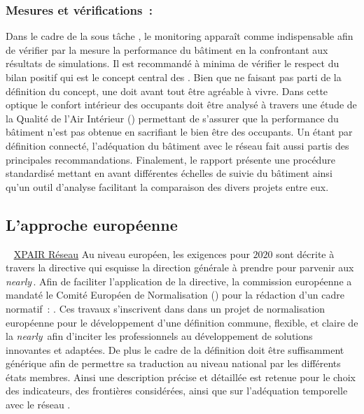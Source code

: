 \subsubsection{Mesures et vérifications~:} %
\label{ssub:mesures_et_verifications}
Dans le cadre de la sous tâche  \parencite{Noris2013}, le monitoring apparaît comme indispensable
afin de vérifier par la mesure la performance du bâtiment en la confrontant aux
résultats de simulations. Il est recommandé à minima de vérifier le respect du bilan
positif qui est le concept central des . Bien que ne faisant pas parti de
la définition du concept, une  doit avant tout être agréable à vivre. Dans cette
optique le confort intérieur des occupants doit être analysé à travers une étude de
la Qualité de l’Air Intérieur () permettant de s’assurer que la performance du bâtiment n’est pas
obtenue en sacrifiant le bien être des occupants. Un  étant par définition connecté,
l’adéquation du bâtiment avec le réseau fait aussi partis des principales recommandations.
Finalement, le rapport présente une procédure standardisé mettant en avant différentes échelles
de suivie du bâtiment ainsi qu’un outil d’analyse facilitant la comparaison des divers projets entre eux.


\subsection{L’approche européenne} %
\label{ssub:l_approche_europeenne}
~
\href{http://tinyurl.com/y7uqfe8r}{XPAIR Réseau}
Au niveau européen, les exigences pour $2020$ sont décrite à travers la directive
 \parencite{EPBD2010} qui esquisse la direction générale à prendre pour
parvenir aux \textit{nearly}\,. Afin de faciliter l’application de la directive, la commission
européenne a mandaté le Comité Européen de Normalisation ()
pour la rédaction d’un cadre normatif~:  . Ces travaux s’inscrivent
dans dans un projet de normalisation européenne pour le développement d’une définition
commune, flexible, et claire de la \textit{nearly}\, afin d’inciter les professionnels au développement
de solutions innovantes et adaptées. De plus le cadre de la définition doit être
suffisamment générique afin de permettre sa traduction au niveau national par les différents
états membres. Ainsi une description précise et détaillée est retenue pour le choix des indicateurs,
des frontières considérées, ainsi que sur l’adéquation temporelle avec le réseau \parencite{Zirngibl2014}.


